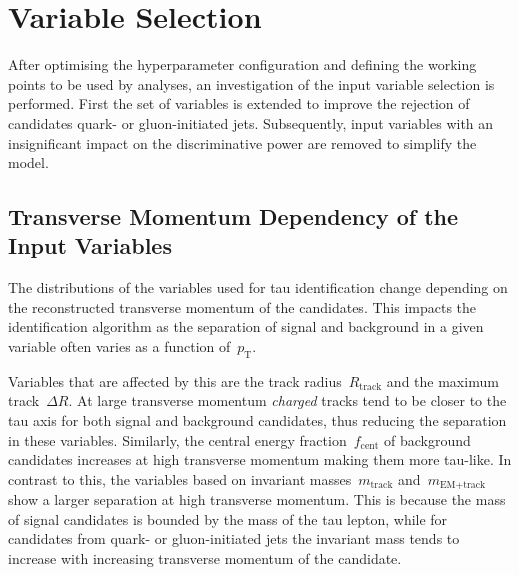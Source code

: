 \section{Variable Selection}
\label{sec:bdt_variable_selection}

After optimising the hyperparameter configuration and defining the working
points to be used by analyses, an investigation of the input variable selection
is performed. First the set of variables is extended to improve the rejection of
\tauhadvis candidates quark- or gluon-initiated jets. Subsequently, input
variables with an insignificant impact on the discriminative power are removed
to simplify the model.

\subsection{Transverse Momentum Dependency of the Input Variables}
\label{sec:bdt_incl_pt}


The distributions of the variables used for tau identification change depending
on the reconstructed transverse momentum of the \tauhadvis candidates. This
impacts the identification algorithm as the separation of signal and background
in a given variable often varies as a function of~$p_\text{T}$.

Variables that are affected by this are the track radius~$R_\text{track}$ and
the maximum track~$\Delta R$. At large transverse momentum \emph{charged} tracks
tend to be closer to the tau axis for both signal and background candidates,
thus reducing the separation in these variables. Similarly, the central energy
fraction~$f_\text{cent}$ of background candidates increases at high transverse
momentum making them more tau-like. In contrast to this, the variables based on
invariant masses~$m_\text{track}$ and~$m_\text{EM+track}$ show a larger
separation at high transverse momentum. This is because the mass of signal
candidates is bounded by the mass of the tau lepton, while for candidates from
quark- or gluon-initiated jets the invariant mass tends to increase with
increasing transverse momentum of the \tauhadvis candidate. 

